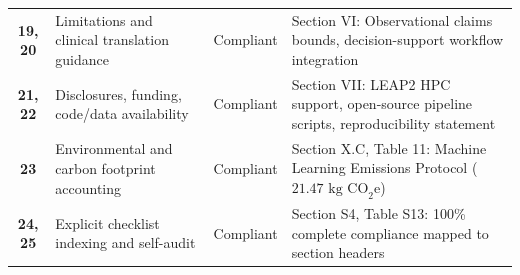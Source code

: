 \documentclass[10pt,journal]{IEEEtran}
\begin{document}
\begin{table}[!t]
\begin{tabular}{cp{}cp{}}
\textbf{19, 20} & Limitations and clinical translation guidance & Compliant & Section VI: Observational claims bounds, decision-support workflow integration \\
\textbf{21, 22} & Disclosures, funding, code/data availability & Compliant & Section VII: LEAP2 HPC support, open-source pipeline scripts, reproducibility statement \\
\textbf{23} & Environmental and carbon footprint accounting & Compliant & Section X.C, Table 11: Machine Learning Emissions Protocol ($21.47\text{ kg CO}_2\text{e}$) \\
\textbf{24, 25} & Explicit checklist indexing and self-audit & Compliant & Section S4, Table S13: 100\% complete compliance mapped to section headers \\
\bottomrule
\end{tabular}
\end{table}
\end{document}
